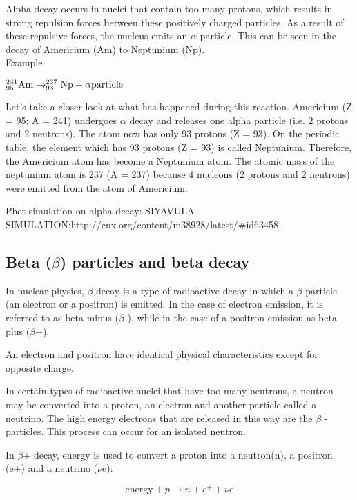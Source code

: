 Alpha decay occurs in nuclei that contain too many protons, which results in strong repulsion forces between these positively charged particles. As a result of these repulsive forces, the nucleus emits an $\alpha$ particle. This can be seen in the decay of Americium (Am) to Neptunium (Np).\\

Example:

\begin{center}
$\rm{^{241}_{95}Am \rightarrow ^{237}_{93}Np + \alpha particle}$
\end{center}

Let's take a closer look at what has happened during this reaction. Americium (Z = 95; A = 241) undergoes $\alpha$ decay and releases one alpha particle (i.e. 2 protons and 2 neutrons). The atom now has only 93 protons (Z = 93). On the periodic table, the element which has 93 protons (Z = 93) is called Neptunium. Therefore, the Americium atom has become a Neptunium atom. The atomic mass of the neptunium atom is 237 (A = 237) because 4 nucleons (2 protons and 2 neutrons) were emitted from the atom of Americium.

Phet simulation on alpha decay: SIYAVULA-SIMULATION:http://cnx.org/content/m38928/latest/#id63458
\subsection{Beta ($\beta$) particles and beta decay}
In nuclear physics, $\beta$ decay is a type of radioactive decay in which a $\beta$ particle (an electron or a positron) is emitted. In the case of electron emission, it is referred to as beta minus ($\beta$-), while in the case of a positron emission as beta plus ($\beta$+).

An electron and positron have identical physical characteristics except for opposite charge.

In certain types of radioactive nuclei that have too many neutrons, a neutron may be converted into a proton, an electron and another particle called a neutrino. The high energy electrons that are released in this way are the $\beta$ - particles. This process can occur for an isolated neutron.

In $\beta$+ decay, energy is used to convert a proton into a neutron(n), a
positron (e+) and a neutrino ($\nu$e):

\begin{equation*}
 \mbox{energy} + p \rightarrow n + e^+ + {\nu}e
\end{equation*}

